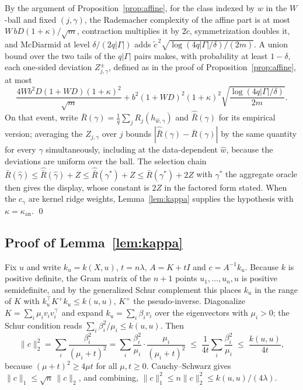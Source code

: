 By the argument of Proposition~\ref{prop:affine}, for the class
indexed by $w$ in the $W$-ball and fixed $(j,\gamma)$, the
Rademacher complexity of the affine part is at most
$W\,bD(1+\kappa)/\sqrt m$, contraction multiplies it by $2\tilde c$,
symmetrization doubles it, and McDiarmid at level $\delta/(2q|\Gamma|)$ adds
$\tilde c^{\,2}\sqrt{\log(4q|\Gamma|/\delta)/(2m)}$. A union bound over the
two tails of the $q|\Gamma|$ pairs makes, with probability at least
$1-\delta$, each one-sided deviation $Z^{\pm}_{j,\gamma}$, defined as in the
proof of Proposition~\ref{prop:affine},
at most
\[
\frac{4W b^2D(1+WD)(1+\kappa)^2}{\sqrt m}
+b^2(1+WD)^2(1+\kappa)^2\sqrt{\frac{\log(4q|\Gamma|/\delta)}{2m}} .
\]
On that event, write $\bar R(\gamma)=\tfrac1q\sum_jR_j(h_{\widehat w,\gamma})$
and $\widehat{\bar R}(\gamma)$ for its empirical version; averaging the
$Z_{j,\gamma}$ over $j$ bounds
$|\widehat{\bar R}(\gamma)-\bar R(\gamma)|$ by the same quantity for every
$\gamma$ simultaneously, including at the data-dependent $\widehat w$,
because the deviations are uniform over the ball. The selection chain
$\bar R(\widehat\gamma)\le\widehat{\bar R}(\widehat\gamma)+Z\le
\widehat{\bar R}(\gamma^\ast)+Z\le\bar R(\gamma^\ast)+2Z$ with
$\gamma^\ast$ the aggregate oracle then gives the display, whose constant is
$2Z$ in the factored form stated. When the $c_\gamma$ are kernel ridge
weights, Lemma~\ref{lem:kappa} supplies the hypothesis with
$\kappa=\kappa_{\mathrm{an}}$. \qed

\subsection{Proof of Lemma~\ref{lem:kappa}}
\label{proof:lem:kappa}

Fix $u$ and write $k_u=k(X,u)$, $t=n\lambda$, $A=K+tI$ and $c=A^{-1}k_u$.
Because $k$ is positive definite, the Gram matrix of the $n+1$ points
$u_1,\dots,u_n,u$ is positive semidefinite, and by the generalized Schur
complement this places $k_u$ in the range of $K$ with
$k_u^\top K^{+}k_u\le k(u,u)$, $K^{+}$ the pseudo-inverse. Diagonalize
$K=\sum_i\mu_iv_iv_i^\top$ and expand $k_u=\sum_i\beta_iv_i$ over the
eigenvectors with $\mu_i>0$; the Schur condition reads
$\sum_i\beta_i^2/\mu_i\le k(u,u)$. Then
\[
\|c\|_2^2=\sum_i\frac{\beta_i^2}{(\mu_i+t)^2}
=\sum_i\frac{\beta_i^2}{\mu_i}\cdot\frac{\mu_i}{(\mu_i+t)^2}
\;\le\;\frac{1}{4t}\sum_i\frac{\beta_i^2}{\mu_i}\;\le\;\frac{k(u,u)}{4t},
\]
because $(\mu+t)^2\ge4\mu t$ for all $\mu,t\ge0$. Cauchy--Schwarz gives
$\|c\|_1\le\sqrt n\,\|c\|_2$, and combining,
$\|c\|_1^2\le n\|c\|_2^2\le k(u,u)/(4\lambda)$.

